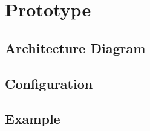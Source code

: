 \chapter{Prototype}
\label{chap:prototype}

\section{Architecture Diagram}
\label{sec:p_architecture_diagram}

\section{Configuration}
\label{sec:p_configuration}

\section{Example}
\label{sec:p_example}